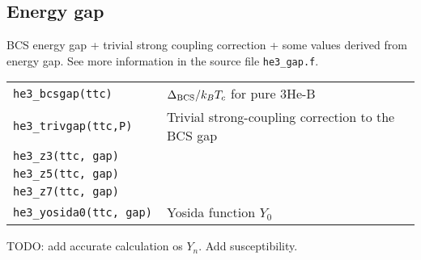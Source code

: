 \documentclass[a4paper]{article}
\begin{document}
\eject
\subsection*{Energy gap}

BCS energy gap + trivial strong coupling correction + some values
derived from energy gap. See more information in the
source file {\tt he3\_gap.f}.

\medskip
\begin{tabular}{lp{9cm}}
\tt he3\_bcsgap(ttc)    & $\Delta_{\rm BCS}/ k_B T_c$ for pure 3He-B\\
\tt he3\_trivgap(ttc,P) & Trivial strong-coupling correction to the BCS gap\\
\tt he3\_z3(ttc, gap)      &\\
\tt he3\_z5(ttc, gap)      &\\
\tt he3\_z7(ttc, gap)      &\\
\tt he3\_yosida0(ttc, gap) & Yosida function $Y_0$\\
\end{tabular}
\medskip

\noindent TODO: add accurate calculation os $Y_n$. Add susceptibility.

\end{document}

